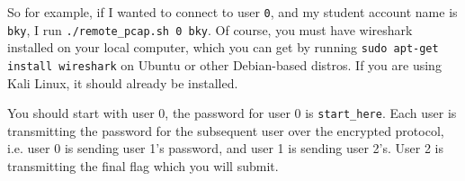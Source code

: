 {                    So for example, if I wanted to connect to user \lstinline`0`, and my student account name is \lstinline`bky`, I run \lstinline`./remote_pcap.sh 0 bky`. 
                    Of course, you must have wireshark installed on your local computer, which you can get by running \lstinline`sudo apt-get install wireshark` on Ubuntu or other Debian-based distros.
                    If you are using Kali Linux, it should already be installed.

                    You should start with user 0, the password for user 0 is \lstinline`start_here`. Each user is transmitting the password for the subsequent user over the encrypted protocol, i.e. user 0 is sending user 1's password, and user 1 is sending user 2's. User 2 is transmitting the final flag which you will submit. 

}

